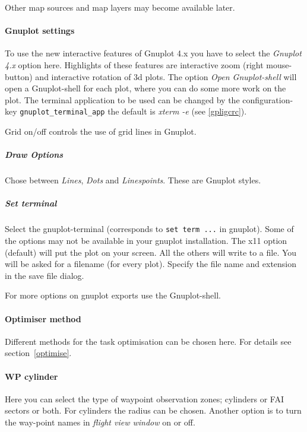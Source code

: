 Other map sources and map layers may become available later.




\paragraph{Gnuplot settings}
To use the new interactive features of Gnuplot 4.x you have to select the \emph{Gnuplot 4.x} option here. Highlights of these features are interactive zoom (right mouse-button) and interactive rotation of 3d plots.
The option \emph{Open Gnuplot-shell} will open a Gnuplot-shell for each plot, where you can do some more work on the plot. The  terminal application to be used can be changed by the configuration-key \texttt{gnuplot\_terminal\_app} the default is \emph{xterm -e} (see \ref{gpligcrc}).

Grid on/off controls the use of grid lines in Gnuplot.

\subparagraph{Draw Options}
Chose between \emph{Lines}, \emph{Dots} and \emph{Linespoints}. These are Gnuplot styles.


\subparagraph{Set terminal}
Select the gnuplot-terminal (corresponds to \texttt{set term ...} in gnuplot).
Some of the options may not be available in your gnuplot installation.
The x11 option (default) will put the plot on your screen.
All the others will write to a file. You will be asked for a filename (for
every plot). Specify the file name and extension in the save file dialog.

For more options on gnuplot exports use the Gnuplot-shell.


\paragraph{Optimiser method}
Different methods for the task optimisation can be chosen here. For details see section~\ref{optimise}.

\paragraph{WP cylinder}
Here you can select the type of waypoint observation zones; cylinders or FAI
sectors or both. For cylinders the radius can be chosen. Another option is to
turn the way-point names in \emph{flight view window} on or off.


